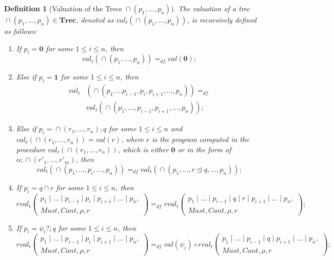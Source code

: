 \documentclass{fcs}
\newtheorem{mydef}{Definition}[section]
\newcommand{\bff}[1]{\mathbf{#1}}
\newcommand{\noth}[0]{\mathbf{1}}
\newcommand{\halt}[0]{\mathbf{0}}
\newcommand{\val}[0]{\mathit{val}}
\DeclareMathOperator{\seq}{;}
\DeclareMathOperator{\para}{\cap}
\newcommand{\Trec}[0]{\bff{Trec}}
\newcommand{\Must}[0]{\mathit{Must}}
\newcommand{\Cannot}[0]{\mathit{Cant}}
\newcommand{\rfval}[0]{\mathit{rval}_t}
\newcommand{\valt}[0]{\val_t}
\DeclareMathOperator{\sep}{|}
\DeclareMathOperator{\link}{\unlhd}
\newcommand{\dddef}[0]{=_{df}}
\begin{document}
\begin{mydef}[Valuation of the Trecs $\para(p_1,...,p_n)$]
	\label{def:Valuation of the Trecs}
	The valuation of a trec $\para(p_1,...,p_n)\in \Trec$, denoted as $\valt(\para(p_1,...,p_n))$, is recursively defined as follows:

	\begin{enumerate}
	    \item If $p_i = \halt$ for some $1\le i\le n$, then
		$$\valt(\para(p_1,...,p_n))\dddef \val(\halt);$$
		
		\item Else if $p_i = \noth$ for some $1\le i\le n$, then
		$$\begin{aligned}
        \valt&(\para(p_1,...p_{i-1}, p_i, p_{i+1},..., p_n))\dddef\\
		&\valt(\para(p_1,...,p_{i-1}, p_{i+1},..., p_n));
\end{aligned}$$
		
        \item Else if $p_i = \para(r_{1},...,r_n)\seq q$ for some $1\le i\le n$ and $\valt(\para(r_1,...,r_n)) = \val(r)$, where
        $r$ is the program computed in the procedure $\valt(\para(r_1,...,r_n))$, which is either $\halt$ or in the form of $\alpha\seq \para(r'_1,...,r'_m)$,
        then
        $$\valt(\para(p_1,...,p_i,...,p_n))\dddef \valt(\para(p_1,...,r\link q,...,p_n));$$

		\ifx
		\item If $p_i = q\cap r$ for some $1\le i\le n$, then
		$$\rfval\left(\begin{gathered}p_1\sep...\sep p_{i-1}\sep p_i\sep p_{i+1}\sep...\sep p_n,\\
		\Must,\Cannot, \rho, r\end{gathered}\right)\dddef
		\rfval\left(\begin{gathered}p_1\sep...\sep p_{i-1}\sep q\sep r\sep p_{i+1}\sep...\sep p_n, \\
		\Must, \Cannot, \rho, r\end{gathered}\right);$$
		\fi
		
		\ifx
		\item If $p_i = \psi_i?;q$ for some $1\le i\le n$, then
		$$\rfval\left(\begin{gathered}p_1\sep...\sep p_{i-1}\sep p_i\sep p_{i+1}\sep...\sep p_n,\\
		\Must,\Cannot, \rho, r\end{gathered}\right)
		\dddef
		\val(\psi_i)\circ \rfval\left(\begin{gathered}p_1\sep...\sep p_{i-1}\sep q\sep p_{i+1}\sep...\sep p_n, \\
		\Must, \Cannot, \rho, r\end{gathered}\right);$$
		\fi
		

\end{enumerate}
\end{mydef}
\end{document}
